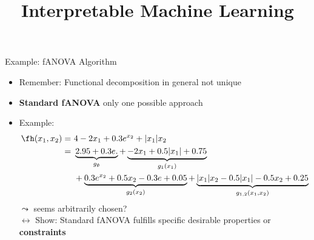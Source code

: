 \documentclass[11pt,compress,t,notes=noshow, aspectratio=169, xcolor=table]{beamer}
\title{Interpretable Machine Learning}
\date{}
\begin{document}
\newcommand{\titlefigure}{figure/25-05-31_Hooker_2004_graph_fANOVA}
\newcommand{\learninggoals}{
\item Properties of classical fANOVA, reason for its popularity
\item Equivalent definition of classical fANOVA
\item Understand the role constraints play for any functional decomposition
}


\begin{frame}{Example: fANOVA Algorithm}
    \begin{itemize}
        \item Remember: Functional decomposition in general not unique
        \item \textbf{Standard fANOVA} only one possible approach
        \item Example:
        \begin{align*}
            \fh(x_1, x_2) =\,&\,4 - 2x_1 + 0.3 e^{x_2} + |x_1|x_2 \\
            =\,&\,\underbrace{2.95 + 0.3 e.}_{g_\emptyset} + \underbrace{-2x_1 + 0.5|x_1| + 0.75}_{g_1(x_1)} \\
            \,&\,+ \underbrace{0.3 e^{x_2} + 0.5x_2 - 0.3e + 0.05}_{g_2(x_2)} + \underbrace{|x_1| x_2 - 0.5 |x_1| - 0.5 x_2 + 0.25}_{g_{1,2}(x_1, x_2)}
        \end{align*}
        $\leadsto$ seems arbitrarily chosen? \\
        $\longleftrightarrow$ Show: Standard fANOVA fulfills specific desirable properties or \textbf{constraints}
    \end{itemize}




    
\end{frame}
\end{document}
